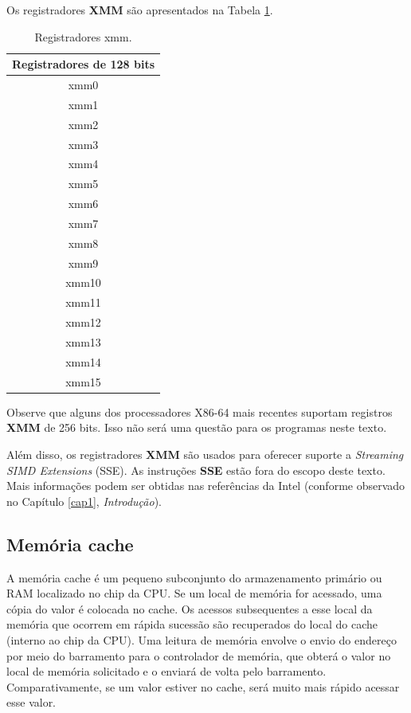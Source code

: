 Os registradores \textbf{XMM} são apresentados na Tabela \ref{tab:xmm}.


\begin{table}[h]
	\centering
	\begin{tabular}{|c|}
		\hline
		\rowcolor[HTML]{C0C0C0} 
		\textbf{Registradores de 128 bits} \\ \hline
		xmm0 \\ \hline
		xmm1 \\ \hline
		xmm2 \\ \hline
		xmm3 \\ \hline
		xmm4 \\ \hline
		xmm5 \\ \hline
		xmm6 \\ \hline
		xmm7 \\ \hline
		xmm8 \\ \hline
		xmm9 \\ \hline
		xmm10 \\ \hline
		xmm11 \\ \hline
		xmm12 \\ \hline
		xmm13 \\ \hline
		xmm14 \\ \hline
		xmm15 \\ \hline
	\end{tabular}
	
	\caption{Registradores xmm.}
	\label{tab:xmm}
\end{table}

Observe que alguns dos processadores X86-64 mais recentes suportam registros \textbf{XMM} de 256 bits. Isso não será uma questão para os programas neste texto.

Além disso, os registradores \textbf{XMM} são usados para oferecer suporte a \textit{Streaming SIMD Extensions} (SSE). As instruções \textbf{SSE} estão fora do escopo deste texto. Mais informações podem ser obtidas nas referências da Intel (conforme observado no Capítulo \ref{cap1}, \textit{Introdução}).

\subsection{Memória cache}
A memória cache é um pequeno subconjunto do armazenamento primário ou RAM localizado no chip da CPU. Se um local de memória for acessado, uma cópia do valor é colocada no cache. Os acessos subsequentes a esse local da memória que ocorrem em rápida sucessão são recuperados do local do cache (interno ao chip da CPU). Uma leitura de memória envolve o envio do endereço por meio do barramento para o controlador de memória, que obterá o valor no local de memória solicitado e o enviará de volta pelo barramento. Comparativamente, se um valor estiver no cache, será muito mais rápido acessar esse valor.

